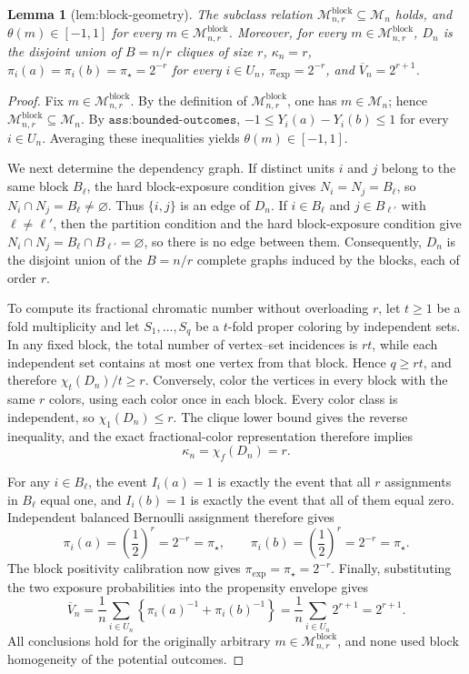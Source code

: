 \documentclass{article}
\newtheorem{lemma}{Lemma}
\begin{document}
\begin{lemma}[lem:block-geometry]\label{lem:block-geometry}
The subclass relation \(\mathcal M_{n,r}^{\mathrm{block}}\subseteq\mathcal M_n\) holds, and \(\theta(m)\in[-1,1]\) for every \(m\in\mathcal M_{n,r}^{\mathrm{block}}\). Moreover, for every \(m\in\mathcal M_{n,r}^{\mathrm{block}}\), \(D_n\) is the disjoint union of \(B=n/r\) cliques of size \(r\), \(\kappa_n=r\), \(\pi_i(a)=\pi_i(b)=\pi_\star=2^{-r}\) for every \(i\in U_n\), \(\pi_{\exp}=2^{-r}\), and \(\overline V_n=2^{r+1}\).
\end{lemma}
\begin{proof}
Fix \(m\in\mathcal M_{n,r}^{\mathrm{block}}\). By the definition of \(\mathcal M_{n,r}^{\mathrm{block}}\), one has \(m\in\mathcal M_n\); hence \(\mathcal M_{n,r}^{\mathrm{block}}\subseteq\mathcal M_n\). By \(\texttt{ass:bounded-outcomes}\), \(-1\le Y_i(a)-Y_i(b)\le 1\) for every \(i\in U_n\). Averaging these inequalities yields \(\theta(m)\in[-1,1]\).

We next determine the dependency graph. If distinct units \(i\) and \(j\) belong to the same block \(B_\ell\), the hard block-exposure condition gives \(N_i=N_j=B_\ell\), so \(N_i\cap N_j=B_\ell\ne\varnothing\). Thus \(\{i,j\}\) is an edge of \(D_n\). If \(i\in B_\ell\) and \(j\in B_{\ell'}\) with \(\ell\ne\ell'\), then the partition condition and the hard block-exposure condition give \(N_i\cap N_j=B_\ell\cap B_{\ell'}=\varnothing\), so there is no edge between them. Consequently, \(D_n\) is the disjoint union of the \(B=n/r\) complete graphs induced by the blocks, each of order \(r\).

To compute its fractional chromatic number without overloading \(r\), let \(t\ge1\) be a fold multiplicity and let \(S_1,\ldots,S_q\) be a \(t\)-fold proper coloring by independent sets. In any fixed block, the total number of vertex--set incidences is \(rt\), while each independent set contains at most one vertex from that block. Hence \(q\ge rt\), and therefore \(\chi_t(D_n)/t\ge r\). Conversely, color the vertices in every block with the same \(r\) colors, using each color once in each block. Every color class is independent, so \(\chi_1(D_n)\le r\). The clique lower bound gives the reverse inequality, and the exact fractional-color representation therefore implies
\[
\kappa_n=\chi_f(D_n)=r.
\]

For any \(i\in B_\ell\), the event \(I_i(a)=1\) is exactly the event that all \(r\) assignments in \(B_\ell\) equal one, and \(I_i(b)=1\) is exactly the event that all of them equal zero. Independent balanced Bernoulli assignment therefore gives
\[
\pi_i(a)=\left(\frac12\right)^r=2^{-r}=\pi_\star,\qquad \pi_i(b)=\left(\frac12\right)^r=2^{-r}=\pi_\star.
\]
The block positivity calibration now gives \(\pi_{\exp}=\pi_\star=2^{-r}\). Finally, substituting the two exposure probabilities into the propensity envelope gives
\[
\overline V_n=\frac1n\sum_{i\in U_n}\left\{\pi_i(a)^{-1}+\pi_i(b)^{-1}\right\}=\frac1n\sum_{i\in U_n}2^{r+1}=2^{r+1}.
\]
All conclusions hold for the originally arbitrary \(m\in\mathcal M_{n,r}^{\mathrm{block}}\), and none used block homogeneity of the potential outcomes.
\end{proof}
\end{document}
